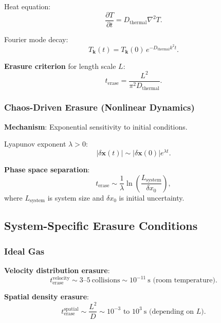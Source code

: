 \documentclass[11pt]{article}
\theoremstyle{defstyle}
\theoremstyle{mapstyle}
\begin{document}
Heat equation:
\begin{equation}
\frac{\partial T}{\partial t} = D_{\text{thermal}} \nabla^2 T.
\end{equation}

Fourier mode decay:
\begin{equation}
T_{\mathbf{k}}(t) = T_{\mathbf{k}}(0)\, e^{-D_{\text{thermal}} k^2 t}.
\end{equation}

\textbf{Erasure criterion} for length scale $L$:
\begin{equation}
\boxed{t_{\text{erase}} = \frac{L^2}{\pi^2 D_{\text{thermal}}}.}
\end{equation}

\subsubsection{Chaos-Driven Erasure (Nonlinear Dynamics)}

\textbf{Mechanism}: Exponential sensitivity to initial conditions.

Lyapunov exponent $\lambda>0$:
\begin{equation}
|\delta \mathbf{x}(t)| \sim |\delta \mathbf{x}(0)| e^{\lambda t}.
\end{equation}

\textbf{Phase space separation}:
\begin{equation}
\boxed{t_{\text{erase}} \sim \frac{1}{\lambda} \ln\!\left(\frac{L_{\text{system}}}{\delta x_0}\right),}
\end{equation}
where $L_{\text{system}}$ is system size and $\delta x_0$ is initial uncertainty.

\subsection{System-Specific Erasure Conditions}

\subsubsection{Ideal Gas}

\textbf{Velocity distribution erasure}:
\[
\boxed{t_{\text{erase}}^{\text{velocity}} \sim 3\text{--}5\ \text{collisions} \sim 10^{-11}\ \text{s (room temperature)}.}
\]

\textbf{Spatial density erasure}:
\[
\boxed{t_{\text{erase}}^{\text{spatial}} \sim \frac{L^2}{D} \sim 10^{-3}\text{ to }10^{3}\ \text{s (depending on }L\text{)}.}
\]
\end{document}
